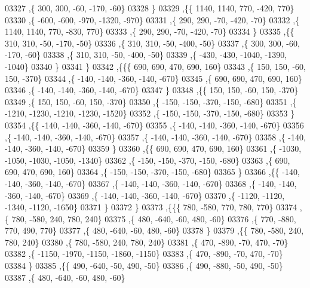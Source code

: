 \begin{DoxyCode}
03327     ,\{   300,   300,   -60,  -170,   -60\}
03328     \}
03329    ,\{\{  1140,  1140,   770,  -420,   770\}
03330     ,\{  -600,  -600,  -970, -1320,  -970\}
03331     ,\{   290,   290,   -70,  -420,   -70\}
03332     ,\{  1140,  1140,   770,  -830,   770\}
03333     ,\{   290,   290,   -70,  -420,   -70\}
03334     \}
03335    ,\{\{   310,   310,   -50,  -170,   -50\}
03336     ,\{   310,   310,   -50,  -400,   -50\}
03337     ,\{   300,   300,   -60,  -170,   -60\}
03338     ,\{   310,   310,   -50,  -400,   -50\}
03339     ,\{  -430,  -430, -1040, -1390, -1040\}
03340     \}
03341    \}
03342   ,\{\{\{   690,   690,   470,   690,   160\}
03343     ,\{   150,   150,   -60,   150,  -370\}
03344     ,\{  -140,  -140,  -360,  -140,  -670\}
03345     ,\{   690,   690,   470,   690,   160\}
03346     ,\{  -140,  -140,  -360,  -140,  -670\}
03347     \}
03348    ,\{\{   150,   150,   -60,   150,  -370\}
03349     ,\{   150,   150,   -60,   150,  -370\}
03350     ,\{  -150,  -150,  -370,  -150,  -680\}
03351     ,\{ -1210, -1230, -1210, -1230, -1520\}
03352     ,\{  -150,  -150,  -370,  -150,  -680\}
03353     \}
03354    ,\{\{  -140,  -140,  -360,  -140,  -670\}
03355     ,\{  -140,  -140,  -360,  -140,  -670\}
03356     ,\{  -140,  -140,  -360,  -140,  -670\}
03357     ,\{  -140,  -140,  -360,  -140,  -670\}
03358     ,\{  -140,  -140,  -360,  -140,  -670\}
03359     \}
03360    ,\{\{   690,   690,   470,   690,   160\}
03361     ,\{ -1030, -1050, -1030, -1050, -1340\}
03362     ,\{  -150,  -150,  -370,  -150,  -680\}
03363     ,\{   690,   690,   470,   690,   160\}
03364     ,\{  -150,  -150,  -370,  -150,  -680\}
03365     \}
03366    ,\{\{  -140,  -140,  -360,  -140,  -670\}
03367     ,\{  -140,  -140,  -360,  -140,  -670\}
03368     ,\{  -140,  -140,  -360,  -140,  -670\}
03369     ,\{  -140,  -140,  -360,  -140,  -670\}
03370     ,\{ -1120, -1120, -1340, -1120, -1650\}
03371     \}
03372    \}
03373   ,\{\{\{   780,  -580,   770,   780,   770\}
03374     ,\{   780,  -580,   240,   780,   240\}
03375     ,\{   480,  -640,   -60,   480,   -60\}
03376     ,\{   770,  -880,   770,   490,   770\}
03377     ,\{   480,  -640,   -60,   480,   -60\}
03378     \}
03379    ,\{\{   780,  -580,   240,   780,   240\}
03380     ,\{   780,  -580,   240,   780,   240\}
03381     ,\{   470,  -890,   -70,   470,   -70\}
03382     ,\{ -1150, -1970, -1150, -1860, -1150\}
03383     ,\{   470,  -890,   -70,   470,   -70\}
03384     \}
03385    ,\{\{   490,  -640,   -50,   490,   -50\}
03386     ,\{   490,  -880,   -50,   490,   -50\}
03387     ,\{   480,  -640,   -60,   480,   -60\}

\end{DoxyCode}
